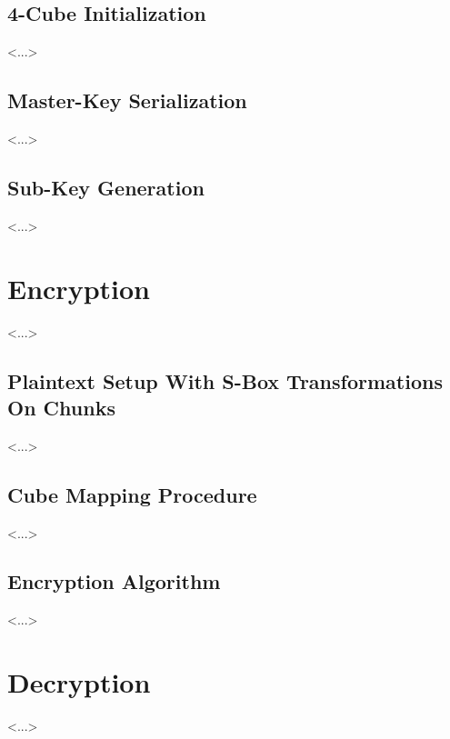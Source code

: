 \documentclass[12pt]{article}
\begin{document}
\subsection{4-Cube Initialization}
<...>

\subsection{Master-Key Serialization}
<...>

\subsection{Sub-Key Generation}
<...>

\section{Encryption}
<...>

\subsection{Plaintext Setup With S-Box Transformations On Chunks}
<...>

\subsection{Cube Mapping Procedure}
<...>

\subsection{Encryption Algorithm}
<...>

\section{Decryption}
<...>
\end{document}
